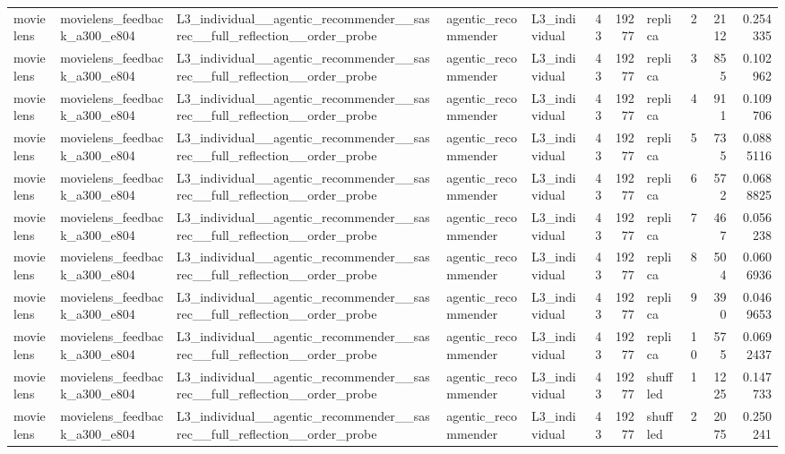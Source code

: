 \begin{table}[htbp!]
\begin{tabular}{lllllrrlrrr}
movielens & movielens\_feedback\_a300\_e804 & L3\_individual\_\_agentic\_recommender\_\_sasrec\_\_full\_reflection\_\_order\_probe & agentic\_recommender & L3\_individual & 43 & 19277 & replica & 2 & 2112 & 0.254335 \\
movielens & movielens\_feedback\_a300\_e804 & L3\_individual\_\_agentic\_recommender\_\_sasrec\_\_full\_reflection\_\_order\_probe & agentic\_recommender & L3\_individual & 43 & 19277 & replica & 3 & 855 & 0.102962 \\
movielens & movielens\_feedback\_a300\_e804 & L3\_individual\_\_agentic\_recommender\_\_sasrec\_\_full\_reflection\_\_order\_probe & agentic\_recommender & L3\_individual & 43 & 19277 & replica & 4 & 911 & 0.109706 \\
movielens & movielens\_feedback\_a300\_e804 & L3\_individual\_\_agentic\_recommender\_\_sasrec\_\_full\_reflection\_\_order\_probe & agentic\_recommender & L3\_individual & 43 & 19277 & replica & 5 & 735 & 0.0885116 \\
movielens & movielens\_feedback\_a300\_e804 & L3\_individual\_\_agentic\_recommender\_\_sasrec\_\_full\_reflection\_\_order\_probe & agentic\_recommender & L3\_individual & 43 & 19277 & replica & 6 & 572 & 0.0688825 \\
movielens & movielens\_feedback\_a300\_e804 & L3\_individual\_\_agentic\_recommender\_\_sasrec\_\_full\_reflection\_\_order\_probe & agentic\_recommender & L3\_individual & 43 & 19277 & replica & 7 & 467 & 0.056238 \\
movielens & movielens\_feedback\_a300\_e804 & L3\_individual\_\_agentic\_recommender\_\_sasrec\_\_full\_reflection\_\_order\_probe & agentic\_recommender & L3\_individual & 43 & 19277 & replica & 8 & 504 & 0.0606936 \\
movielens & movielens\_feedback\_a300\_e804 & L3\_individual\_\_agentic\_recommender\_\_sasrec\_\_full\_reflection\_\_order\_probe & agentic\_recommender & L3\_individual & 43 & 19277 & replica & 9 & 390 & 0.0469653 \\
movielens & movielens\_feedback\_a300\_e804 & L3\_individual\_\_agentic\_recommender\_\_sasrec\_\_full\_reflection\_\_order\_probe & agentic\_recommender & L3\_individual & 43 & 19277 & replica & 10 & 575 & 0.0692437 \\
movielens & movielens\_feedback\_a300\_e804 & L3\_individual\_\_agentic\_recommender\_\_sasrec\_\_full\_reflection\_\_order\_probe & agentic\_recommender & L3\_individual & 43 & 19277 & shuffled & 1 & 1225 & 0.147733 \\
movielens & movielens\_feedback\_a300\_e804 & L3\_individual\_\_agentic\_recommender\_\_sasrec\_\_full\_reflection\_\_order\_probe & agentic\_recommender & L3\_individual & 43 & 19277 & shuffled & 2 & 2075 & 0.250241 \\

\end{tabular}
\end{table}
